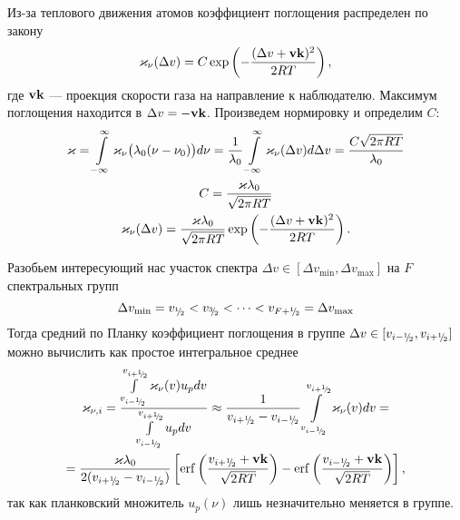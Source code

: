 Из-за теплового движения атомов коэффициент поглощения распределен по закону
\[
\varkappa_\nu(\Delta v) = C\exp\left(-\frac{(\Delta v + \boldsymbol{\mathbf{v}}\boldsymbol{\mathbf{k}})^2}{2RT}\right),
\]
где $\boldsymbol{\mathbf{v}}\boldsymbol{\mathbf{k}}$ --- проекция скорости газа на направление к наблюдателю. Максимум поглощения находится в $\Delta v = -\boldsymbol{\mathbf{v}}\boldsymbol{\mathbf{k}}$.
Произведем нормировку и определим $C$:
\begin{gather}\notag
\varkappa = \int\limits_{-\infty}^\infty \varkappa_\nu\big(\lambda_0(\nu - \nu_0)\big) d\nu = 
\frac{1}{\lambda_0} \int\limits_{-\infty}^\infty \varkappa_\nu(\Delta v) d\Delta v = 
\frac{C\sqrt{2\pi RT}}{\lambda_0}\\\notag
C = \frac{\varkappa \lambda_0}{\sqrt{2\pi RT}}\\
\varkappa_\nu(\Delta v) = \frac{\varkappa \lambda_0}{\sqrt{2\pi RT}}\exp\left(-\frac{(\Delta v + \boldsymbol{\mathbf{v}}\boldsymbol{\mathbf{k}})^2}{2RT}\right).
\label{eq:absorb}
\end{gather}

Разобьем интересующий нас участок спектра $\Delta v \in [\Delta v_{\min}, \Delta v_{\max}]$ на $F$ спектральных групп
\[
\Delta v_{\min} = v_{{}^{1}\mkern-5mu/{\!}_{2}} < v_{{}^{3}\mkern-5mu/{\!}_{2}} < \dots < v_{F+{}^{1}\mkern-5mu/{\!}_{2}} = \Delta v_{\max}
\]
Тогда средний по Планку коэффициент поглощения в группе $\Delta v \in [v_{i-{}^{1}\mkern-5mu/{\!}_{2}}, v_{i+{}^{1}\mkern-5mu/{\!}_{2}}]$ можно вычислить как простое интегральное среднее
\begin{multline*}
\varkappa_{\nu,i} = 
\frac{\int\limits_{v_{i-\half}}^{v_{i+\half}} \varkappa_\nu(v) u_p dv}
{\int\limits_{v_{i-\half}}^{v_{i+\half}} u_p dv}
\approx 
\frac{1}{v_{i+\half} - v_{i-\half}}\int\limits_{v_{i-\half}}^{v_{i+\half}} \varkappa_\nu(v) dv
= \\ =
\frac{\varkappa \lambda_0}{2(v_{i+\half} - v_{i-\half})} \left[
\operatorname{erf}\left(\frac{v_{i+\half} + \bvec{v}\bvec{k}}{\sqrt{2RT}}\right)
-
\operatorname{erf}\left(\frac{v_{i-\half} + \bvec{v}\bvec{k}}{\sqrt{2RT}}\right)
\right],
\end{multline*}
так как планковский множитель $u_p(\nu)$ лишь незначительно меняется в группе.